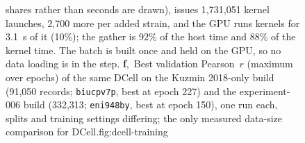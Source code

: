 \begin{figure}[t]
{shares rather than seconds are drawn), issues 1,731,051 kernel launches, 2,700 more per
added strain, and the GPU runs kernels for 3.1~s of it (10\%); the gather is 92\% of the
host time and 88\% of the kernel time. The batch is built once and held on the GPU, so no
data loading is in the step.
\textbf{f},~Best validation Pearson~$r$ (maximum over epochs) of the same DCell on
the Kuzmin 2018-only build (91,050 records; \texttt{biucpv7p}, best at epoch 227) and the
experiment-006 build (332,313; \texttt{eni948by}, best at epoch 150), one run each, splits
and training settings differing; the only measured data-size comparison for DCell.}{fig:dcell-training}
\end{figure}



